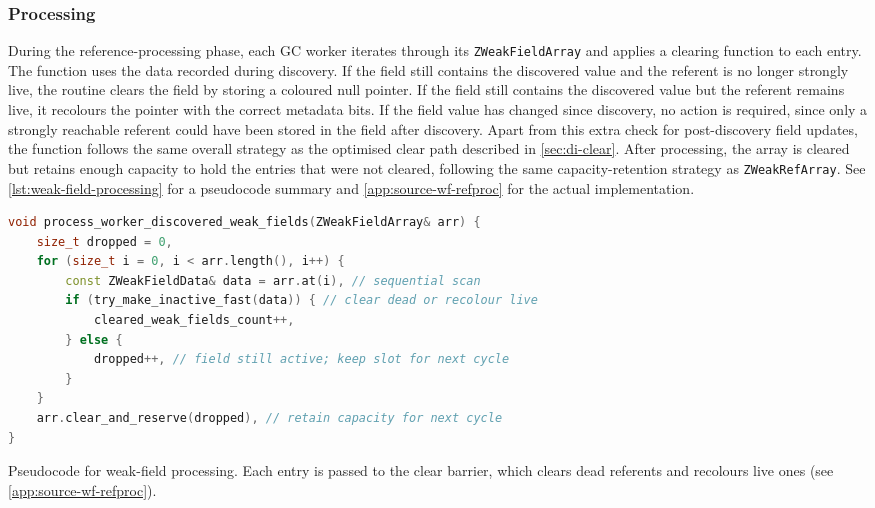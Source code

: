 \subsubsection{Processing}

During the reference-processing phase, each \ac{GC} worker iterates through its \texttt{ZWeakFieldArray} and applies a clearing function to each entry. The function uses the data recorded during discovery. If the field still contains the discovered value and the referent is no longer strongly live, the routine clears the field by storing a coloured null pointer. If the field still contains the discovered value but the referent remains live, it recolours the pointer with the correct metadata bits. If the field value has changed since discovery, no action is required, since only a strongly reachable referent could have been stored in the field after discovery. Apart from this extra check for post-discovery field updates, the function follows the same overall strategy as the optimised clear path described in \cref{sec:di-clear}. After processing, the array is cleared but retains enough capacity to hold the entries that were not cleared, following the same capacity-retention strategy as \texttt{ZWeakRefArray}. See \cref{lst:weak-field-processing} for a pseudocode summary and \cref{app:source-wf-refproc} for the actual implementation.

\begin{listing}[t]
\begin{lstlisting}[language=C++]
void process_worker_discovered_weak_fields(ZWeakFieldArray& arr) {
    size_t dropped = 0,
    for (size_t i = 0, i < arr.length(), i++) {
        const ZWeakFieldData& data = arr.at(i), // sequential scan
        if (try_make_inactive_fast(data)) { // clear dead or recolour live
            cleared_weak_fields_count++,
        } else {
            dropped++, // field still active; keep slot for next cycle
        }
    }
    arr.clear_and_reserve(dropped), // retain capacity for next cycle
}
\end{lstlisting}
\caption[Weak-field processing]{Pseudocode for weak-field processing. Each entry is passed to the clear barrier, which clears dead referents and recolours live ones (see \cref{app:source-wf-refproc}).}
\label{lst:weak-field-processing}
\end{listing}

